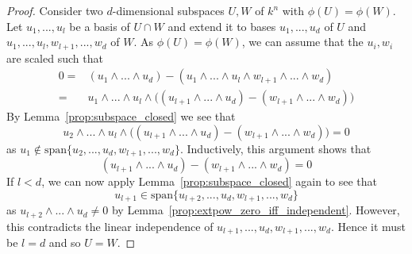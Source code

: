 \documentclass{scrartcl}
\newcommand{\vspan}{\mathrm{span}}
\begin{document}
\begin{proof}
    Consider two $d$-dimensional subspaces $U, W$ of $k^n$ with $\phi(U) = \phi(W)$.
    Let $u_1, ..., u_l$ be a basis of $U \cap W$ and extend it to bases $u_1, ..., u_d$ of $U$ and $u_1, ..., u_l, w_{l + 1}, ..., w_d$ of $W$.
    As $\phi(U) = \phi(W)$, we can assume that the $u_i, w_i$ are scaled such that
    \begin{align*}
        0 =& (u_1 \wedge ... \wedge u_d) - (u_1 \wedge ... \wedge u_l \wedge w_{l + 1} \wedge ... \wedge w_d) \\
        =& u_1 \wedge ... \wedge u_l \wedge \bigl( (u_{l + 1} \wedge ... \wedge u_d) - (w_{l + 1} \wedge ... \wedge w_d) \bigr)
    \end{align*}
    By Lemma~\ref{prop:subspace_closed} we see that
    \begin{equation*}
        u_2 \wedge ... \wedge u_l \wedge \bigl( (u_{l + 1} \wedge ... \wedge u_d) - (w_{l + 1} \wedge ... \wedge w_d) \bigr) = 0
    \end{equation*}
    as $u_1 \notin \vspan\{u_2, ..., u_d, w_{l + 1}, ..., w_d\}$.
    Inductively, this argument shows that
    \begin{equation*}
        (u_{l + 1} \wedge ... \wedge u_d) - (w_{l + 1} \wedge ... \wedge w_d) = 0
    \end{equation*}
    If $l < d$, we can now apply Lemma~\ref{prop:subspace_closed} again to see that
    \begin{equation*}
        u_{l + 1} \in \vspan\{ u_{l + 2}, ..., u_d, w_{l + 1}, ..., w_d \}
    \end{equation*}
    as $u_{l + 2} \wedge ... \wedge u_d \neq 0$ by Lemma~\ref{prop:extpow_zero_iff_independent}.
    However, this contradicts the linear independence of $u_{l + 1}, ..., u_d, w_{l + 1}, ..., w_d$.
    Hence it must be $l = d$ and so $U = W$.
\end{proof}
\end{document}
